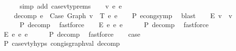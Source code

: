 \begin{isabellebody}
\ \ \ \ \isamarkupfalse%
\ {\isacharparenleft}{\kern0pt}simp\ add{\isacharcolon}{\kern0pt}\ case{}{\isacharunderscore}{\kern0pt}v{\isacharunderscore}{\kern0pt}ty{\isachardot}{\kern0pt}prems{\isacharparenright}{\kern0pt}\isanewline
\isanewline
\ \ \isamarkupfalse%
\ v{\isacharprime}{\kern0pt}{\isacharprime}{\kern0pt}\ e{}{\isacharprime}{\kern0pt}{\isacharprime}{\kern0pt}\ e{}{\isacharprime}{\kern0pt}{\isacharprime}{\kern0pt}\ \isanewline
\ \ \ \ decomp{\isacharcolon}{\kern0pt}\ {\isachardoublequoteopen}e{}{\isacharprime}{\kern0pt}\ {\isacharequal}{\kern0pt}\ Case\ {\isacharparenleft}{\kern0pt}Graph\ v{\isacharprime}{\kern0pt}{\isacharprime}{\kern0pt}{\isacharparenright}{\kern0pt}\ {\isasymGamma}\ T\ e{}{\isacharprime}{\kern0pt}{\isacharprime}{\kern0pt}\ e{}{\isacharprime}{\kern0pt}{\isacharprime}{\kern0pt}{\isachardoublequoteclose}\isanewline
\ \ \isamarkupfalse%
\ P{}\ econg{\isacharunderscore}{\kern0pt}symp\ \isamarkupfalse%
\ blast\isanewline
\isanewline
\ \ \isamarkupfalse%
\ E{}{\isacharcolon}{\kern0pt}\ {\isachardoublequoteopen}v\ {\isasymsimeq}\ v{\isacharprime}{\kern0pt}{\isacharprime}{\kern0pt}{\isachardoublequoteclose}\isanewline
\ \ \ \ \isamarkupfalse%
\ P{}\ decomp\ \isamarkupfalse%
\ fastforce\isanewline
\ \ \isamarkupfalse%
\ E{}{\isacharcolon}{\kern0pt}\ {\isachardoublequoteopen}e{}\ {\isasymsimeq}e\ e{}{\isacharprime}{\kern0pt}{\isacharprime}{\kern0pt}{\isachardoublequoteclose}\isanewline
\ \ \ \ \isamarkupfalse%
\ P{}\ decomp\ \isamarkupfalse%
\ fastforce\isanewline
\ \ \isamarkupfalse%
\ E{}{\isacharcolon}{\kern0pt}\ {\isachardoublequoteopen}e{}\ {\isasymsimeq}e\ e{}{\isacharprime}{\kern0pt}{\isacharprime}{\kern0pt}{\isachardoublequoteclose}\isanewline
\ \ \ \ \isamarkupfalse%
\ P{}\ decomp\ \isamarkupfalse%
\ fastforce\isanewline
\isanewline
\ \ \isamarkupfalse%
\ {\isacharquery}{\kern0pt}case\isanewline
\ \ \ \ \isamarkupfalse%
\ P{}\ case{}{\isacharunderscore}{\kern0pt}v{\isacharunderscore}{\kern0pt}ty{\isachardot}{\kern0pt}hyps\ cong{\isacharunderscore}{\kern0pt}is{\isacharunderscore}{\kern0pt}graph{\isacharunderscore}{\kern0pt}val\ decomp\ \isamarkupfalse%

\end{isabellebody}
